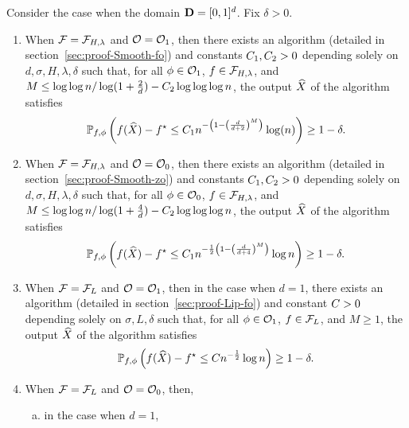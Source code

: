 \begin{theorem}
\label{thm:ubmain}
Consider the case when the domain $\mathbf{D} = [0, 1]^d$. Fix $\delta > 0$.
\begin{enumerate}[1.]
\item When $\mathcal{F} = \mathcal{F}_{H, \lambda}$ and $\mathcal{O} = \mathcal{O}_1$, then there exists an algorithm (detailed 
in section~\ref{sec:proof-Smooth-fo}) and constants
$C_1, C_2 > 0$ 
depending solely on $d, \sigma, H, \lambda, \delta$ such that,  for all
$\phi \in \mathcal{O}_1$, $f\in \mathcal{F}_{H, \lambda}$, and
$M \leq \log \log n/\log (1+\frac{2}{d}) - C_2
	\log\log\log n$, 
the output $\widehat{X}$ of the algorithm satisfies
\begin{equation*}
\mathbb{P}_{f, \phi} \left( f(\widehat{X}) - f^\star \leq C_1
	n^{-\left(1-\left(\frac{d}{d+2}\right)^M \right)} \log (n)
		\right) \geq 1-\delta.
\end{equation*}
\item When $\mathcal{F} = \mathcal{F}_{H, \lambda}$ and $\mathcal{O} = \mathcal{O}_0$, then there exists an algorithm (detailed 
in section~\ref{sec:proof-Smooth-zo}) and constants
$C_1, C_2 > 0$ depending solely on $d, \sigma, H, \lambda, \delta$ 
such that, for all $\phi \in \mathcal{O}_0$, $f\in \mathcal{F}_{H, \lambda}$, and 
$M \leq \log \log n/\log (1+\frac{4}{d}) -
	C_2 \log\log\log n$, the output $\widehat{X}$ of the algorithm satisfies
\begin{equation*}
\mathbb{P}_{f, \phi} \left( f(\widehat{X}) - f^\star \leq C_1
	n^{- \frac{1}{2} \left(1-\left(\frac{d}{d+4}\right)^M \right)} \log n \right) \geq 1-\delta.
\end{equation*}
\item When $\mathcal{F} = \mathcal{F}_L$ and $\mathcal{O} = \mathcal{O}_1$, then in the case when $d = 1$, there 
	exists an algorithm (detailed in section~\ref{sec:proof-Lip-fo})
	and constant $C > 0$ depending solely on $\sigma, L, 
	\delta$ 
	such that, for all $\phi \in \mathcal{O}_1$, $f\in \mathcal{F}_L$, and
	$M \geq 1$,
	the output $\widehat{X}$ of the algorithm satisfies
\begin{equation*}
\mathbb{P}_{f, \phi} \left(f(\widehat{X}) - f^\star \leq C n^{-\frac{1}{2}} \log n \right) \geq 1-\delta.
\end{equation*}	
\item When $\mathcal{F} = \mathcal{F}_L$ and $\mathcal{O} = \mathcal{O}_0$, then, 
\begin{enumerate}[(a)]
\item in the case when $d = 1$, 

\end{enumerate}
\end{enumerate}
\end{theorem}
